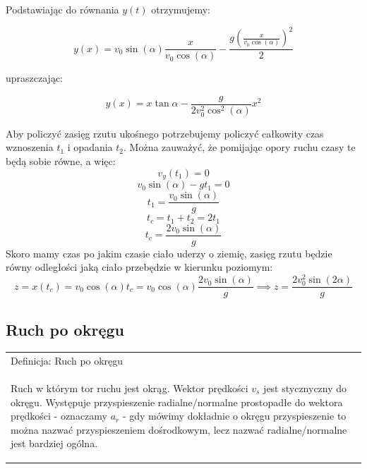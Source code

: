 \documentclass[a4paper]{article}
\newenvironment{definition}[1][title]
    {
        \begin{center}
        \begin{tabular}{|p{1\textwidth}|}
        \hline
            Definicja: #1\\[2ex]
        \begin{em}
        \Large
    }
    { 
        \end{em}
        \\\hline
        \end{tabular} 
        \end{center}
    }
\begin{document}
    \noindent Podstawiając do równania $y(t)$ otrzymujemy:
    
    \[y(x) = v_0\sin(\alpha)\frac{x}{v_0\cos(\alpha)} - \frac{g(\frac{x}{v_0\cos(\alpha)})^2}{2}\]

    \noindent upraszczając:

    \[y(x) = x\tan{\alpha} - \frac{g}{2v_0^2\cos^2(\alpha)}x^2\]

    \noindent Aby policzyć zasięg rzutu ukośnego potrzebujemy policzyć całkowity czas wznoszenia $t_1$ i opadania $t_2$.
    Można zauważyć, że pomijając opory ruchu czasy te będą sobie równe, a więc:
    \[v_y(t_1) = 0\]
    \[v_0\sin(\alpha) - gt_1 = 0\]
    \[t_1 = \frac{v_0\sin(\alpha)}{g}\]
    \[t_c = t_1 + t_2 = 2t_1\]
    \[t_c = \frac{2v_0\sin(\alpha)}{g} \]
    Skoro mamy czas po jakim czasie ciało uderzy o ziemię, zasięg rzutu będzie równy odległości jaką ciało 
    przebędzie w kierunku poziomym:
    \[z = x(t_c) = v_0\cos(\alpha)t_c = v_0\cos(\alpha)\frac{2v_0\sin(\alpha)}{g}
    \implies z = \frac{2v_0^2\sin(2\alpha)}{g}\]

    \subsection{\LARGE Ruch po okręgu}
    \begin{definition}[Ruch po okręgu]
        Ruch w którym tor ruchu jest okrąg. Wektor prędkości $v_s$ jest stycznyczny do okręgu. 
        Występuje przyspieszenie radialne/normalne prostopadłe do wektora prędkości - oznaczamy $a_r$ 
        - gdy mówimy dokładnie o okręgu przyspieszenie to można nazwać przyspieszeniem dośrodkowym, lecz nazwać
        radialne/normalne jest bardziej ogólna.
    \end{definition}
\end{document}
